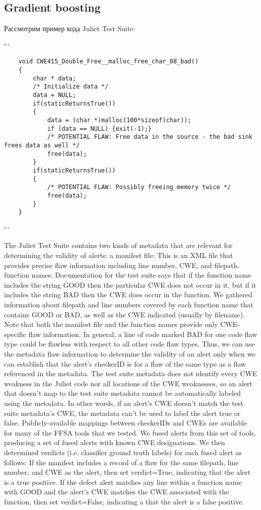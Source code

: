 \subsection{Gradient boosting}

Рассмотрим пример кода Juliet Test Suite:

```
\begin{verbatim}
    void CWE415_Double_Free__malloc_free_char_08_bad()
    {
        char * data;
        /* Initialize data */
        data = NULL;
        if(staticReturnsTrue())
        {
            data = (char *)malloc(100*sizeof(char));
            if (data == NULL) {exit(-1);}
            /* POTENTIAL FLAW: Free data in the source - the bad sink frees data as well */
            free(data);
        }
        if(staticReturnsTrue())
        {
            /* POTENTIAL FLAW: Possibly freeing memory twice */
            free(data);
        }
    }
\end{verbatim}
```


The Juliet Test Suite contains two kinds of metadata that
are relevant for determining the validity of alerts:
a manifest file: This is an XML file that provides precise
flaw information including line number, CWE, and
filepath.
function names: Documentation for the test suite says
that if the function name includes the string GOOD then
the particular CWE does not occur in it, but if it includes
the string BAD then the CWE does occur in the function.
We gathered information about filepath and line numbers
covered by each function name that contains GOOD or
BAD, as well as the CWE indicated (usually by filename).
Note that both the manifest file and the function names
provide only CWE-specific flaw information. In general, a line
of code marked BAD for one code flaw type could be flawless
with respect to all other code flaw types. Thus, we can use the
metadata flaw information to determine the validity of an alert
only when we can establish that the alert’s checkerID is for a
flaw of the same type as a flaw referenced in the metadata. The
test suite metadata does not identify every CWE weakness in
the Juliet code nor all locations of the CWE weaknesses, so
an alert that doesn’t map to the test suite metadata cannot be
automatically labeled using the metadata. In other words, if
an alert’s CWE doesn’t match the test suite metadata’s CWE,
the metadata can’t be used to label the alert true or false.
Publicly-available mappings between checkerIDs and
CWEs are available for many of the FFSA tools that we tested.
We fused alerts from this set of tools, producing a set of fused
alerts with known CWE designations. We then determined
verdicts (i.e. classifier ground truth labels) for each fused alert
as follows:
If the manifest includes a record of a flaw for the
same filepath, line number, and CWE as the alert, then
set verdict=True, indicating that the alert is a true
positive.
If the defect alert matches any line within a function
name with GOOD and the alert’s CWE matches the CWE
associated with the function, then set verdict=False,
indicating a that the alert is a false positive.


\newpage
